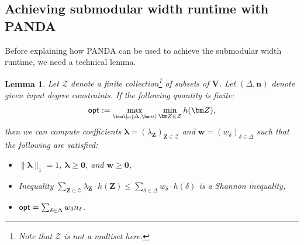 \documentclass[10pt,a4paper]{article}
\newtheorem{lemma}{Lemma}[section]
\newcommand{\norm}[1]{\|#1\|}
\newcommand{\opt}{\text{\sf opt}}
\newcommand{\calZ}{\mathcal Z}
\newcommand{\panda}{\textsf{PANDA}\xspace}
\begin{document}
\subsection{Achieving submodular width runtime with \panda}
\label{subsec:panda:subw}

Before explaining how \panda can be used to achieve the submodular width runtime,
we need a technical lemma.
\begin{lemma}
  \label{lmm:technical}
  Let $\calZ$ denote a finite collection\footnote{Note that $\calZ$ is {\em not} a multiset here.} of subsets of $\bm V$.
  Let $(\Delta,\bm n)$ denote given input degree constraints.
  If the following quantity is finite:
  \begin{align}
    \opt := \max_{\bm h \models (\Delta,\bm n)} \min_{\bm Z \in \calZ} h(\bm Z),
    \label{eq:max:min:problem}
  \end{align}
  then we can compute coefficients
  $\bm\lambda = (\lambda_{\bm Z})_{{\bm Z} \in \calZ}$ and
  $\bm w = (w_{\delta})_{\delta \in \Delta}$ such that the following are
  satisfied:
  \begin{itemize}
    \item[(a)] $\norm{\bm \lambda}_1=1$, $\bm \lambda \geq \bm 0$, and $\bm w \geq \bm 0$,
    \item[(b)]
  Inequality $\sum_{{\bm Z} \in \calZ} \lambda_{\bm Z} \cdot h({\bm Z}) \leq \sum_{\delta \in \Delta} w_\delta \cdot h(\delta)$
  is a Shannon inequality,
    \item[(c)] $\opt = \sum_{\delta\in\Delta}w_\delta n_\delta$.
  \end{itemize}
\end{lemma}
\end{document}
